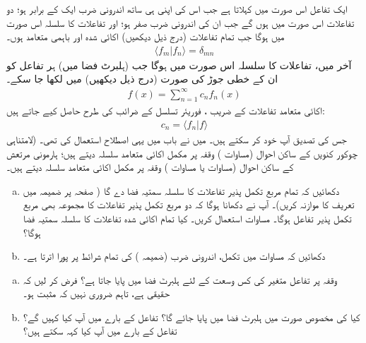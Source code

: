 ایک تفاعل اس صورت میں  کہلاتا ہے جب اس کی اپنی ہی ساتھ اندرونی ضرب ایک  کے برابر ہو؛ دو تفاعلات اس صورت میں  ہوں گے جب ان کی اندرونی ضرب صفر  ہو؛ اور تفاعلات کا سلسلہ اس صورت میں  ہوگا جب تمام تفاعلات (درج ذیل دیکھیں) اکائی شدہ اور باہمی متعامد ہوں۔
\begin{align}\label{مساوات_قواعد_معیاری_عمودیت_الف}
	\langle f_m | f_n \rangle = \delta_{mn}
\end{align}
آخر میں، تفاعلات  کا  سلسلہ اس صورت میں  ہوگا جب (ہلبرٹ فضا میں)  ہر تفاعل کو ان کے خطی جوڑ کی صورت (درج ذیل دیکھیں) میں لکھا جا سکے۔
\begin{align}\label{مساوات_قواعد_خطی_جوڑ_الف}
	f(x) = \sum\limits_{n=1}^\infty c_{n} f_{n}(x)
\end{align}
اکائی متعامد تفاعلات  کے  ضریب ، فوریئر تسلسل کے ضرائب کی طرح حاصل کیے جاتے ہیں:
\begin{align}
	c_{n} = \langle f_{n} | f \rangle
\end{align}
جس کی تصدیق آپ خود کر سکتے ہیں۔ میں نے باب  میں یہی اصطلاح استعمال کی تھی۔ (لامتناہی چوکور کنویں کے ساکن احوال (مساوات )  وقفہ  پر مکمل اکائی متعامد سلسلہ دیتے ہیں؛ ہارمونی مرتعش کے ساکن احوال (مساوات  یا مساوات ) وقفہ  پر مکمل اکائی متعامد سلسلہ دیتے ہیں۔

\begin{enumerate}[a.]
\item
دکھائیں  کہ تمام مربع تکمل پذیر تفاعلات کا سلسلہ سمتیہ فضا دے گا ( صفحہ  پر ضمیمہ  میں تعریف کا موازنہ کریں)۔  آپ نے دکھانا ہوگا کہ  دو مربع تکمل پذیر تفاعلات کا مجموعہ بھی مربع تکمل پذیر تفاعل ہوگا۔ مساوات   استعمال کریں۔ کیا تمام اکائی شدہ  تفاعلات کا سلسلہ سمتیہ فضا ہوگا؟
 \item
دکھائیں کہ مساوات   میں تکمل، اندرونی ضرب (ضمیمہ )  کی تمام شرائط پر پورا اترتا   ہے۔
 \end{enumerate}
\begin{enumerate}[a.]
\item
  وقفہ  پر تفاعل    متغیر  کی کس وسعت کے لئے  ہلبرٹ فضا میں   پایا جاتا ہے؟ فرض کر لیں کہ  حقیقی  ہے، تاہم ضروری نہیں کہ   مثبت ہو۔
\item
 کیا  کی مخصوص صورت میں   ہلبرٹ فضا میں پایا جائے گا؟ تفاعل  کے بارے میں آپ کیا کہیں گے؟ تفاعل  کے بارے میں آپ کیا کہہ سکتے ہیں؟
 \end{enumerate}

